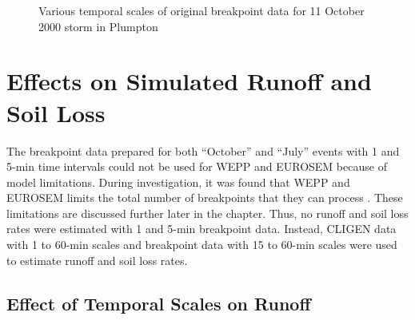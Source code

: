 \begin{figure}[htbp]
    \qquad
  \caption{Various temporal scales of original breakpoint data for 11 October
2000 storm in Plumpton}
  \label{fig:pl_storm}
\end{figure}

\section{Effects on Simulated Runoff and Soil Loss}
\label{sec:TemporalScalesSimulatedRunoffAndSoilLoss}

The breakpoint data prepared for both ``October'' and ``July'' events with 1 and
5-min time intervals could not be used for WEPP and EUROSEM because of model
limitations. During investigation, it was found that WEPP and EUROSEM limits the
total number of breakpoints that they can process
\citep{flanagan1995-weppusersummary, morgan1998-europeansoilerosion}. These
limitations are discussed further later in the chapter. Thus, no runoff and soil
loss rates were estimated with 1 and 5-min breakpoint data. Instead, CLIGEN data
with 1 to 60-min scales and breakpoint data with 15 to 60-min scales were used
to estimate runoff and soil loss rates.

\subsection{Effect of Temporal Scales on Runoff}
\label{sec:TemporalScalesSimulatedRunoff}

